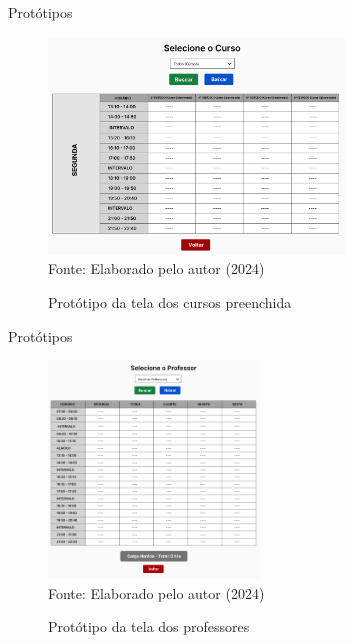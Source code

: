 \begin{frame}{Protótipos}
    \begin{figure}
        \centering
        \vspace{-0.5cm}
        \caption{Protótipo da tela dos cursos preenchida}
        \vspace{-0.2cm}
        \includegraphics[width=0.7\textwidth]{figuras/proto-3.png}
        \\ %
        \small Fonte: Elaborado pelo autor (2024)
    \end{figure}
\end{frame}

\begin{frame}{Protótipos}
    \begin{figure}
        \centering
        \vspace{-0.5cm}
        \caption{Protótipo da tela dos professores}
        \vspace{-0.2cm}
        \includegraphics[width=0.5\textwidth]{figuras/proto-4.png}
        \\ %
        \small Fonte: Elaborado pelo autor (2024)
    \end{figure}
\end{frame}

